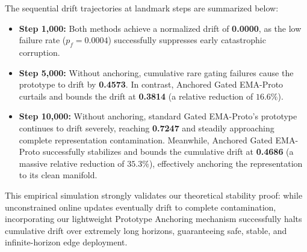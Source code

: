\documentclass{article}
\theoremstyle{plain}
\theoremstyle{definition}
\theoremstyle{remark}
\begin{document}
The sequential drift trajectories at landmark steps are summarized below:
\begin{itemize}
    \item \textbf{Step 1,000:} Both methods achieve a normalized drift of \textbf{0.0000}, as the low failure rate ($p_f=0.0004$) successfully suppresses early catastrophic corruption.
    \item \textbf{Step 5,000:} Without anchoring, cumulative rare gating failures cause the prototype to drift by \textbf{0.4573}. In contrast, Anchored Gated EMA-Proto curtails and bounds the drift at \textbf{0.3814} (a relative reduction of $16.6\%$).
    \item \textbf{Step 10,000:} Without anchoring, standard Gated EMA-Proto's prototype continues to drift severely, reaching \textbf{0.7247} and steadily approaching complete representation contamination. Meanwhile, Anchored Gated EMA-Proto successfully stabilizes and bounds the cumulative drift at \textbf{0.4686} (a massive relative reduction of $35.3\%$), effectively anchoring the representation to its clean manifold.
\end{itemize}
This empirical simulation strongly validates our theoretical stability proof: while unconstrained online updates eventually drift to complete contamination, incorporating our lightweight Prototype Anchoring mechanism successfully halts cumulative drift over extremely long horizons, guaranteeing safe, stable, and infinite-horizon edge deployment.
\end{document}
